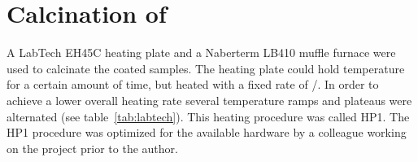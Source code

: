 \section{Calcination of }
\label{sec:exp-calc}
A LabTech EH45C heating plate and a Naberterm LB410 muffle furnace were used to calcinate the coated samples. 
The heating plate could hold temperature for a certain amount of time, but heated with a fixed rate of /\minutes{}.
In order to achieve a lower overall heating rate several temperature ramps and plateaus were alternated (see table~\ref{tab:labtech}). %
This heating procedure was called HP1.
The HP1 procedure was optimized for the available hardware by a colleague working on the 
project prior to the author.

